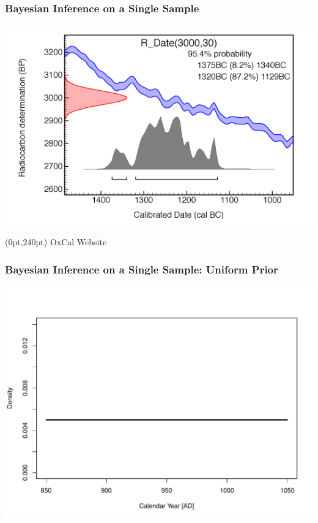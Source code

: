 \documentclass{beamer}
\begin{document}
\begin{frame}[t]
  \frametitle{Bayesian Inference on a Single Sample}
    \begin{center}
      \includegraphics[height=.8\textheight]{calibration.png}
	\begin{textblock*}{100pt}(0pt,240pt)
      		\small OxCal Website \normalsize
	\end{textblock*}
    \end{center}
\end{frame}

\begin{frame}[t]
  \frametitle{Bayesian Inference on a Single Sample: Uniform Prior}
    \begin{center}
      \includegraphics[height=.8\textheight]{single_obs_inf_plot1.pdf}
    \end{center}
\end{frame}
\end{document}
